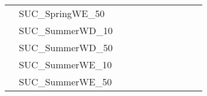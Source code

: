 \begin{table}[]
{\begin{tabular}{|c|l|ll|ll|ll|l|l|l|}
			& SUC\_SpringWE\_50             &                                   &                                  &                           &                          &                           &                          &                                       &                               & \\
			& SUC\_SummerWD\_10             &                                   &                                  &                           &                          &                           &                          &                                       &                               & \\
			& SUC\_SummerWD\_50             &                                   &                                  &                           &                          &                           &                          &                                       &                               & \\
			& SUC\_SummerWE\_10             &                                   &                                  &                           &                          &                           &                          &                                       &                               & \\
			& SUC\_SummerWE\_50             &                                   &                                  &                           &                          &                           &                          &                                       &                               & \\
		\hline
		\end{tabular}%
	}
\end{table}